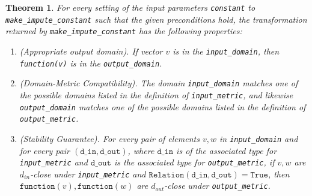 \documentclass[11pt,a4paper]{article}
\newtheorem{theorem}{Theorem}[section]
\newcommand{\din}{\texttt{d\_in}}
\newcommand{\dout}{\texttt{d\_out}}
\newcommand{\Relation}{\texttt{Relation}}
\newcommand{\True}{\texttt{True}}
\newcommand{\function}{\texttt{function}}
\begin{document}
\begin{theorem}
For every setting of the input parameters \texttt{constant} to \texttt{make\_impute\_constant} such that the given preconditions hold, the transformation returned by \texttt{make\_impute\_constant} has the following properties:
\begin{enumerate}
    \item \textup{(Appropriate output domain).} If vector $v$ is in the \texttt{input\_domain}, then \texttt{function(v)} is in the \texttt{output\_domain}.
    \item \textup{(Domain-Metric Compatibility).} The domain \texttt{input\_domain} matches one of the possible domains listed in the definition of \texttt{input\_metric}, and likewise \texttt{output\_domain} matches one of the possible domains listed in the definition of \texttt{output\_metric}.
    \item \textup{(Stability Guarantee).} For every pair of elements $v, w$ in \texttt{input\_domain} and for every pair $(\din, \dout)$, where $\din$ is of the associated type for \texttt{input\_metric} and $\dout$ is the associated type for \texttt{output\_metric}, if $v,w$ are $d_{in}$-close under \texttt{input\_metric} and $\Relation(\din, \dout) = \True$, then $\function(v), \function(w)$ are $d_{out}$-close under \texttt{output\_metric}.
\end{enumerate}
\end{theorem}
\end{document}
